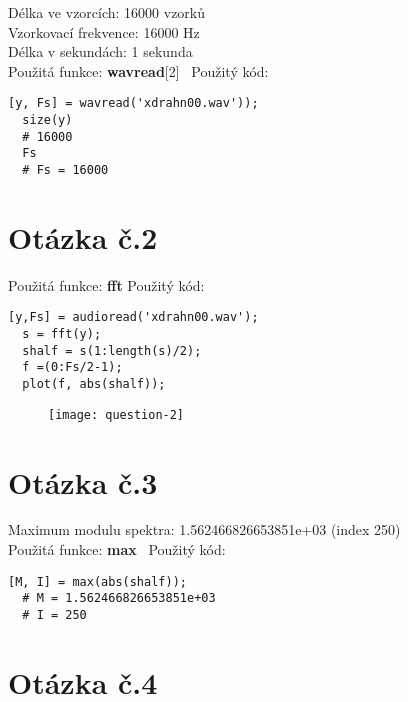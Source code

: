 \documentclass[a4paper,11pt]{article}
\begin{document}
Délka ve vzorcích: 16000 vzorků\\
Vzorkovací frekvence: 16000 Hz\\
Délka v sekundách: 1 sekunda\\
\newline
Použitá funkce: \textbf{wavread}[2]\
\newline
\newline
Použitý kód:
\lstset{language=Octave}
\begin{lstlisting}[frame=single,breaklines]
  [y, Fs] = wavread('xdrahn00.wav'));
  size(y)
  # 16000
  Fs
  # Fs = 16000
\end{lstlisting}

\section{Otázka č.2}

Použitá funkce: \textbf{fft}
\newline
\newline
Použitý kód:
\lstset{language=Matlab}
\begin{lstlisting}[frame=single,breaklines]
  [y,Fs] = audioread('xdrahn00.wav');
  s = fft(y);
  shalf = s(1:length(s)/2);
  f =(0:Fs/2-1);
  plot(f, abs(shalf));
\end{lstlisting}

\begin{figure}[h]
  \centering
  \texttt{[image: question-2]}
\end{figure}

\section{Otázka č.3}

Maximum modulu spektra: 1.562466826653851e+03 (index 250)\\
\newline
Použitá funkce: \textbf{max}\
\newline
\newline
Použitý kód:
\lstset{language=Matlab}
\begin{lstlisting}[frame=single,breaklines]
  [M, I] = max(abs(shalf));
  # M = 1.562466826653851e+03
  # I = 250
\end{lstlisting}

\section{Otázka č.4}
\end{document}
